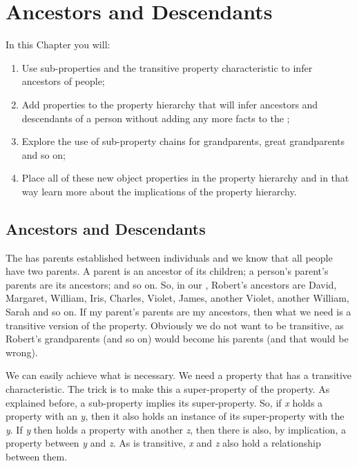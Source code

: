 \chapter{Ancestors and Descendants}
\label{chap:ancestor}
In this Chapter you will:
\begin{enumerate}
\item Use sub-properties and the transitive property characteristic to infer ancestors of people;
\item Add properties to the \fhkb property hierarchy that will infer ancestors and descendants of a person without adding any more facts to the \fhkb;
\item Explore the use of sub-property chains for grandparents, great grandparents and so on;
\item Place all of these new object properties in the property hierarchy and in that way learn more about the implications of the property hierarchy.
\end{enumerate}


\section{Ancestors and Descendants}

The \fhkb has parents established between individuals and we know that all people have two parents. A parent is an ancestor of its children; a person's parent's parents are its ancestors; and so on. So, in our \fhkb, Robert's ancestors are David, Margaret, William, Iris, Charles, Violet, James, another Violet, another William, Sarah and so on. If my parent's parents are my ancestors, then what we need is a transitive version of the  property. Obviously we do not want  to be transitive, as Robert's grandparents (and so on) would become his parents (and that would be wrong).

We can easily achieve what is necessary. We need a  property that has a transitive characteristic. The trick is to make this a super-property of the  property. As explained before, a sub-property implies its super-property. So, if \indiv \emph{x} holds a  property with an \indiv \emph{y}, then it also holds an instance of its super-property  with the \indiv \emph{y}. If \indiv \emph{y} then holds a  property with another \indiv \emph{z}, then there is also, by implication, a  property between \emph{y} and \emph{z}. As  is transitive, \emph{x} and \emph{z} also hold a  relationship between them.

